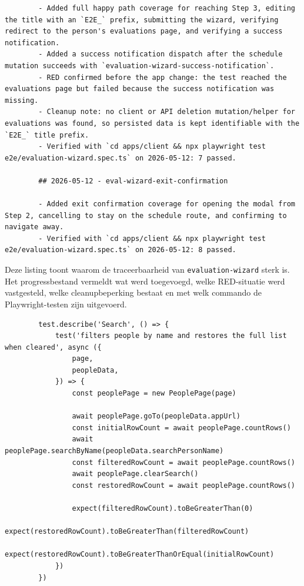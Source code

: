 \begin{listing}[H]
    \begin{verbatim}
        - Added full happy path coverage for reaching Step 3, editing the title with an `E2E_` prefix, submitting the wizard, verifying redirect to the person's evaluations page, and verifying a success notification.
        - Added a success notification dispatch after the schedule mutation succeeds with `evaluation-wizard-success-notification`.
        - RED confirmed before the app change: the test reached the evaluations page but failed because the success notification was missing.
        - Cleanup note: no client or API deletion mutation/helper for evaluations was found, so persisted data is kept identifiable with the `E2E_` title prefix.
        - Verified with `cd apps/client && npx playwright test e2e/evaluation-wizard.spec.ts` on 2026-05-12: 7 passed.
        
        ## 2026-05-12 - eval-wizard-exit-confirmation
        
        - Added exit confirmation coverage for opening the modal from Step 2, cancelling to stay on the schedule route, and confirming to navigate away.
        - Verified with `cd apps/client && npx playwright test e2e/evaluation-wizard.spec.ts` on 2026-05-12: 8 passed.
    \end{verbatim}
    \caption{\texttt{evaluation-wizard.progress.md}: uitvoering en pass count.}
    \label{lst:evaluation-wizard-progress}
\end{listing}

Deze listing toont waarom de traceerbaarheid van \texttt{evaluation-wizard} sterk is. Het progressbestand vermeldt wat werd toegevoegd, welke RED-situatie werd vastgesteld, welke cleanupbeperking bestaat en met welk commando de Playwright-testen zijn uitgevoerd.

\begin{listing}[H]
    \begin{verbatim}
        test.describe('Search', () => {
            test('filters people by name and restores the full list when cleared', async ({
                page,
                peopleData,
            }) => {
                const peoplePage = new PeoplePage(page)
                
                await peoplePage.goTo(peopleData.appUrl)
                const initialRowCount = await peoplePage.countRows()
                await peoplePage.searchByName(peopleData.searchPersonName)
                const filteredRowCount = await peoplePage.countRows()
                await peoplePage.clearSearch()
                const restoredRowCount = await peoplePage.countRows()
                
                expect(filteredRowCount).toBeGreaterThan(0)
                expect(restoredRowCount).toBeGreaterThan(filteredRowCount)
                expect(restoredRowCount).toBeGreaterThanOrEqual(initialRowCount)
            })
        })
    \end{verbatim}
    \caption{\texttt{people.spec.ts}: afzonderlijke happy-flowstappen.}
    \label{lst:people-search-flow}
\end{listing}

